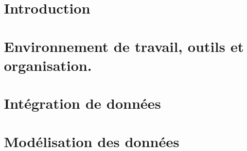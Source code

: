 \documentclass{report}
\begin{document}
\newenvironment{unix}[1]{\par\begin{center}\begin{tt}\$ \emph{#1} \end{tt}\end{center}}{\par}
\newenvironment{block}[1]{\par\vspace{5pt}\underline{\emph{#1}:}} {\par\vspace{5pt}}
\newenvironment{key}[1]{\par\vspace{5pt}\underline{\emph{#1}:}} {\par\vspace{5pt}}

\edef\hc{\string:}
\newcommand{\link}[2]{\textcolor{blue}{\underline{\textit{\href{#1}{#2}}}}}
\newcommand{\sqlcmd}[1]{\begin{tt}\textcolor{NavyBlue}{#1}\end{tt}}
\newcommand{\jb}[1]{\begin{tt}\textcolor{Red}{#1}\end{tt}}

\newpage


\chapter{Introduction}



\chapter{Environnement de travail, outils et organisation.}



\chapter{Intégration de données}



\chapter{Modélisation des données}


\end{document}
